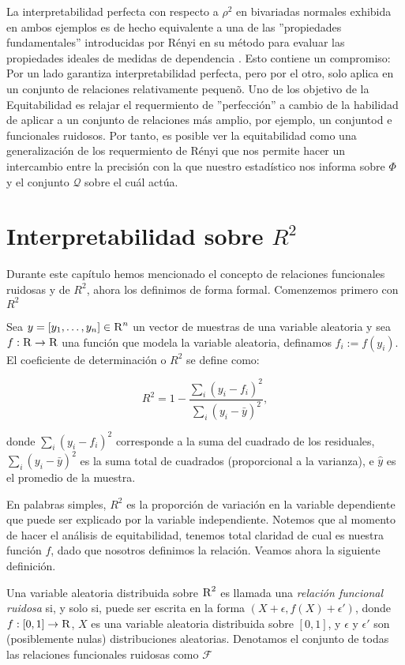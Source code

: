 	La interpretabilidad perfecta con respecto a $\rho^2$ en bivariadas normales exhibida en ambos ejemplos es de hecho equivalente a una de las ''propiedades fundamentales'' introducidas por R\'enyi en su m\'etodo para evaluar las propiedades ideales de medidas de dependencia \cite{renyi1959}. Esto contiene un compromiso: Por un lado garantiza interpretabilidad perfecta, pero por el otro, solo aplica en un conjunto de relaciones relativamente pequen\~o. Uno de los objetivo de la Equitabilidad es relajar el requermiento de ''perfecci\'on'' a cambio de la habilidad de aplicar a un conjunto de relaciones m\'as amplio, por ejemplo, un conjuntod e funcionales ruidosos. Por tanto, es posible ver la equitabilidad como una generalizaci\'on de los requermiento de R\'enyi que nos permite hacer un intercambio entre la precisi\'on con la que nuestro estad\'istico nos informa sobre $\Phi$ y el conjunto $\mathcal{Q}$ sobre el cu\'al act\'ua.
	
	\section[interpretabilidad sobre r2]{Interpretabilidad sobre $R^2$}

	Durante este cap\'itulo hemos mencionado el concepto de relaciones funcionales ruidosas y de $R^2$, ahora los definimos de forma formal. Comenzemos primero con $R^2$
	\begin{defn}[$R^2$]
		Sea $y=[y_1,\dots,y_n]\in\textsc{R}^n$ un vector de muestras de una variable aleatoria y sea $f:\textsc{R}\to\textsc{R}$ una funci\'on que modela la variable aleatoria, definamos $f_i:=f(y_i)$. El coeficiente de determinaci\'on o $R^2$ se define como:

		$$
		R^2 = 1 - \frac{\sum_i(y_i-f_i)^2}{\sum_i(y_i-\bar{y})^2},
		$$

		donde $\sum_i(y_i-f_i)^2$ corresponde a la suma del cuadrado de los residuales, $\sum_i(y_i-\bar{y})^2$ es la suma total de cuadrados (proporcional a la varianza), e $\hat{y}$ es el promedio de la muestra.
	\end{defn}

	En palabras simples, $R^2$ es la proporci\'on de variaci\'on en la variable dependiente que puede ser explicado por la variable independiente. Notemos que al momento de hacer el an\'alisis de equitabilidad, tenemos total claridad de cual es nuestra funci\'on $f$, dado que nosotros definimos la relaci\'on. Veamos ahora la siguiente definici\'on.	
		
	\begin{defn}
		Una variable aleatoria distribuida sobre $\textsc{R}^2$ es llamada una \textit{relaci\'on funcional ruidosa} si, y solo si, puede ser escrita en la forma $(X+\epsilon, f(X)+\epsilon\prime)$, donde $f:[0,1]\to\textsc{R}$, $X$ es una variable aleatoria distribuida sobre $[0,1]$, y $\epsilon$ y $\epsilon\prime$ son (posiblemente nulas) distribuciones aleatorias. Denotamos el conjunto de todas las relaciones funcionales ruidosas como $\mathcal{F}$
		\label{ruido_func}
	\end{defn}

